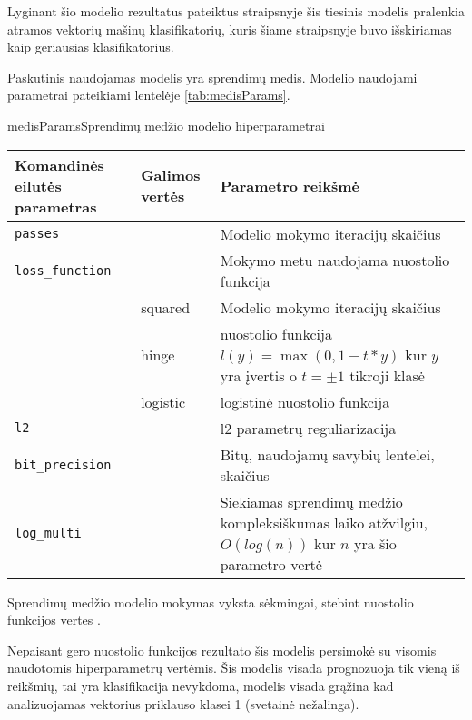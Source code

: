 
Lyginant šio modelio rezultatus pateiktus \cite{comp} straipsnyje šis tiesinis modelis pralenkia
atramos vektorių mašinų klasifikatorių, kuris šiame straipsnyje buvo išskiriamas kaip geriausias klasifikatorius.



Paskutinis naudojamas modelis yra sprendimų medis. Modelio naudojami parametrai pateikiami lentelėje \vref{tab:medisParams}.

\begin{ktutable}{medisParams}{Sprendimų medžio modelio hiperparametrai}
    \begin{tabular}{| l | l | p{7cm}|}
    \hline
        Komandinės eilutės parametras & Galimos vertės & Parametro reikšmė\\ \hline
        \texttt{passes} &  & Modelio mokymo iteracijų skaičius \\ \hline
        \texttt{loss\_function} &          & Mokymo metu naudojama nuostolio funkcija \\
                               & squared  & Modelio mokymo iteracijų skaičius \\
                               & hinge    & nuostolio funkcija $l(y) = \max(0, 1 - t * y)$ kur $y$ yra įvertis o $t = \pm 1$ tikroji klasė  \\
                               & logistic & logistinė nuostolio funkcija \\ \hline
        \texttt{l2} & & l2 parametrų reguliarizacija \\ \hline
        \texttt{bit\_precision} & & Bitų, naudojamų savybių lentelei, skaičius\\ \hline
        \texttt{log\_multi} & & Siekiamas sprendimų medžio kompleksiškumas laiko atžvilgiu, $O(log(n))$ kur $n$ yra šio parametro vertė\\ \hline
    \end{tabular}
\end{ktutable}

Sprendimų medžio modelio mokymas vyksta sėkmingai, stebint nuostolio funkcijos vertes .

Nepaisant gero nuostolio funkcijos rezultato šis modelis persimokė su visomis naudotomis
hiperparametrų vertėmis. Šis modelis visada prognozuoja tik vieną iš reikšmių, tai yra
klasifikacija nevykdoma, modelis visada grąžina kad analizuojamas vektorius priklauso klasei 1 (svetainė nežalinga).

